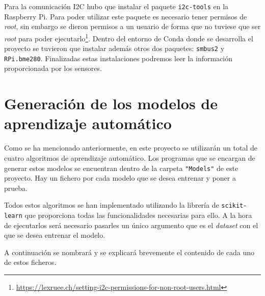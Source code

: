 \documentclass[a4paper, 12pt]{book}
\begin{document}
Para la comunicación I2C hubo que instalar el paquete \texttt{i2c-tools} en la Raspberry Pi. Para poder utilizar este paquete es necesario tener permisos de \textit{root}, sin embargo se dieron permisos a un usuario de forma que no tuviese que ser \textit{root} para poder ejecutarlo\footnote{\url{https://lexruee.ch/setting-i2c-permissions-for-non-root-users.html}}. Dentro del entorno de Conda donde se desarrolla el proyecto se tuvieron que instalar además otros dos paquetes: \texttt{smbus2} y \texttt{RPi.bme280}. Finalizadas estas instalaciones podremos leer la información proporcionada por los sensores.

\section{Generación de los modelos de aprendizaje automático}
\label{sec:generacion_modelos}

Como se ha mencionado anteriormente, en este proyecto se utilizarán un total de cuatro algoritmos de aprendizaje automático. Los programas que se encargan de generar estos modelos se encuentran dentro de la carpeta \texttt{"Models"} de este proyecto. Hay un fichero por cada modelo que se desea entrenar y poner a prueba.

Todos estos algoritmos se han implementado utilizando la librería de \texttt{scikit-learn} que proporciona todas las funcionalidades necesarias para ello. A la hora de ejecutarlos será necesario pasarles un único argumento que es el \textit{dataset} con el que se desea entrenar el modelo.

A continuación se nombrará y se explicará brevemente el contenido de cada uno de estos ficheros.
\end{document}

